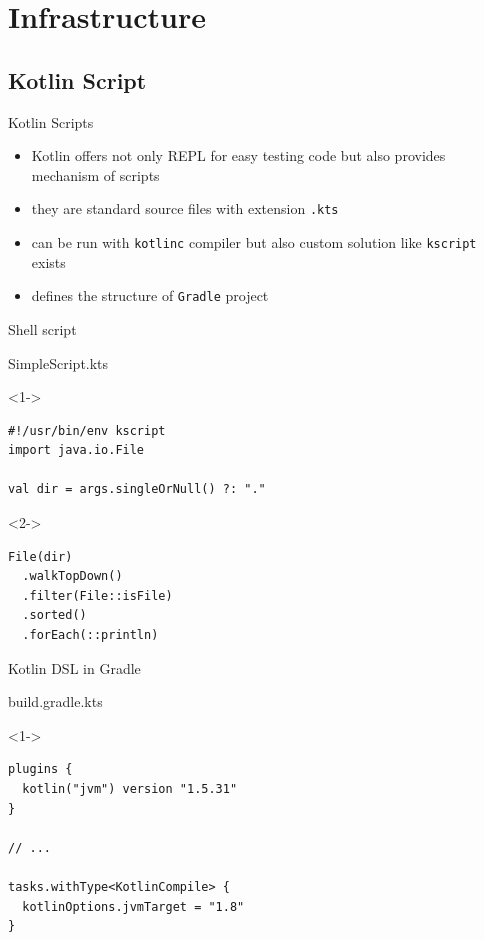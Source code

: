 \documentclass[hyperref={pdfpagelabels=false},xcolor={dvipsnames},compress]{beamer}
\begin{document}
    \section{Infrastructure}

    \subsection{Kotlin Script}

    \begin{frame}{Kotlin Scripts}
        \begin{itemize}
            \item Kotlin offers not only REPL for easy testing code but also provides mechanism of scripts \pause
            \item they are standard source files with extension \texttt{.kts} \pause
            \item can be run with \texttt{kotlinc} compiler but also custom solution like \texttt{kscript} exists \pause
            \item defines the structure of \texttt{Gradle} project
        \end{itemize}
    \end{frame}

    \begin{frame}[fragile]{Shell script}
        \begin{exampleblock}{SimpleScript.kts}
            \begin{onlyenv}<1->
                \begin{lstlisting}
#!/usr/bin/env kscript
import java.io.File

val dir = args.singleOrNull() ?: "."
                \end{lstlisting}
            \end{onlyenv}
            \begin{onlyenv}<2->
                \begin{lstlisting}
File(dir)
  .walkTopDown()
  .filter(File::isFile)
  .sorted()
  .forEach(::println)
                \end{lstlisting}
            \end{onlyenv}
        \end{exampleblock}
    \end{frame}

    \begin{frame}[fragile]{Kotlin DSL in Gradle}
        \begin{exampleblock}{build.gradle.kts}
            \begin{onlyenv}<1->
                \begin{lstlisting}
plugins {
  kotlin("jvm") version "1.5.31"
}

// ...

tasks.withType<KotlinCompile> {
  kotlinOptions.jvmTarget = "1.8"
}
                \end{lstlisting}
            \end{onlyenv}
        \end{exampleblock}
    \end{frame}
\end{document}
